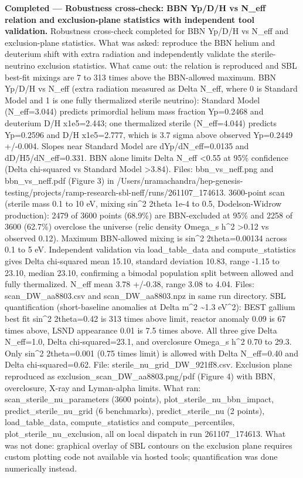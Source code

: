 \documentclass[11pt,a4paper]{article}
\begin{document}
\textbf{Completed --- Robustness cross-check: BBN Yp/D/H vs N\_eff relation and exclusion-plane statistics with independent tool validation.} Robustness cross-check completed for BBN Yp/D/H vs N\_eff and exclusion-plane statistics. What was asked: reproduce the BBN helium and deuterium shift with extra radiation and independently validate the sterile-neutrino exclusion statistics. What came out: the relation is reproduced and SBL best-fit mixings are 7 to 313 times above the BBN-allowed maximum. BBN Yp/D/H vs N\_eff (extra radiation measured as Delta N\_eff, where 0 is Standard Model and 1 is one fully thermalized sterile neutrino): Standard Model (N\_eff=3.044) predicts primordial helium mass fraction Yp=0.2468 and deuterium D/H x1e5=2.443; one thermalized sterile (N\_eff=4.044) predicts Yp=0.2596 and D/H x1e5=2.777, which is 3.7 sigma above observed Yp=0.2449 +/-0.004. Slopes near Standard Model are dYp/dN\_eff=0.0135 and dD/H5/dN\_eff=0.331. BBN alone limits Delta N\_eff \textless{}0.55 at 95\% confidence (Delta chi-squared vs Standard Model \textgreater{}3.84). Files: bbn\_vs\_neff.png and bbn\_vs\_neff.pdf (Figure 3) in /Users/nramachandra/hep-genesis-testing/projects/ramp-research-sbl-neff/runs/261107\_174613. 3600-point scan (sterile mass 0.1 to 10 eV, mixing sin\textasciicircum{}2 2theta 1e-4 to 0.5, Dodelson-Widrow production): 2479 of 3600 points (68.9\%) are BBN-excluded at 95\% and 2258 of 3600 (62.7\%) overclose the universe (relic density Omega\_s h\textasciicircum{}2 \textgreater{}0.12 vs observed 0.12). Maximum BBN-allowed mixing is sin\textasciicircum{}2 2theta=0.00134 across 0.1 to 5 eV. Independent validation via load\_table\_data and compute\_statistics gives Delta chi-squared mean 15.10, standard deviation 10.83, range -1.15 to 23.10, median 23.10, confirming a bimodal population split between allowed and fully thermalized. N\_eff mean 3.78 +/-0.38, range 3.08 to 4.04. Files: scan\_DW\_aa8803.csv and scan\_DW\_aa8803.npz in same run directory. SBL quantification (short-baseline anomalies at Delta m\textasciicircum{}2 \textasciitilde{}1.3 eV\textasciicircum{}2): BEST gallium best fit sin\textasciicircum{}2 2theta=0.42 is 313 times above limit, reactor anomaly 0.09 is 67 times above, LSND appearance 0.01 is 7.5 times above. All three give Delta N\_eff=1.0, Delta chi-squared=23.1, and overclosure Omega\_s h\textasciicircum{}2 0.70 to 29.3. Only sin\textasciicircum{}2 2theta=0.001 (0.75 times limit) is allowed with Delta N\_eff=0.40 and Delta chi-squared=0.62. File: sterile\_nu\_grid\_DW\_921ff8.csv. Exclusion plane reproduced as exclusion\_scan\_DW\_aa8803.png/pdf (Figure 4) with BBN, overclosure, X-ray and Lyman-alpha limits. What ran: scan\_sterile\_nu\_parameters (3600 points), plot\_sterile\_nu\_bbn\_impact, predict\_sterile\_nu\_grid (6 benchmarks), predict\_sterile\_nu (2 points), load\_table\_data, compute\_statistics and compute\_percentiles, plot\_sterile\_nu\_exclusion, all on local dispatch in run 261107\_174613. What was not done: graphical overlay of SBL contours on the exclusion plane requires custom plotting code not available via hosted tools; quantification was done numerically instead.
\end{document}
